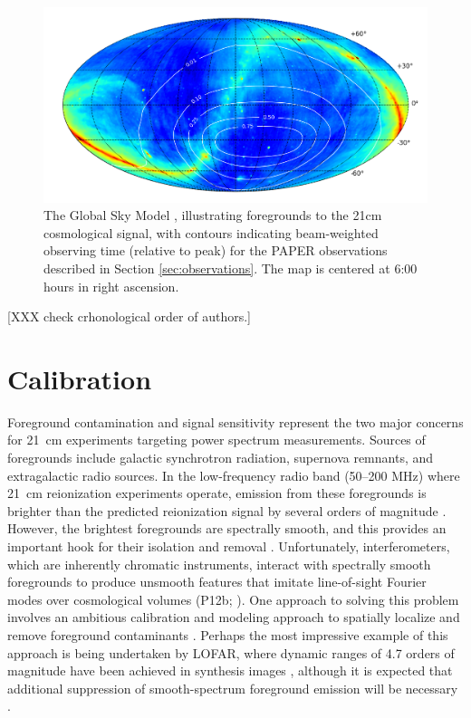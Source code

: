 \documentclass[twocolumn,numberedappendix]{emulateapj} \shorttitle{New Limits on the 21 cm Power Spectrum at $z=8.4$}
\begin{document}
\begin{figure}\centering
\includegraphics[width=2\columnwidth]{plots/coverage.png}
\caption{The Global Sky Model \citep{deoliveira2008}, illustrating foregrounds to the 21cm
cosmological signal, with 
contours indicating beam-weighted observing time (relative to peak) for the PAPER observations
described in Section \ref{sec:observations}.  The map is centered at 6:00 hours in right ascension.
}\label{fig:coverage}
\end{figure}


[XXX check crhonological order of authors.]
\section{Calibration}\label{sec:calib}

Foreground contamination and signal sensitivity represent the two major concerns for 21~cm
experiments targeting power spectrum measurements. Sources of foregrounds include
galactic synchrotron radiation, supernova remnants, and extragalactic radio sources.
In the low-frequency radio band (50--200 MHz) where 21~cm reionization
experiments operate, emission from these foregrounds is brighter than the
predicted reionization signal by several orders of magnitude
\citep{santos_et_al2005,ali_et_al2008,deoliveira2008,jelic_et_al2008,bernardi_et_al2009,bernardi_et_al2010,ghosh_et_al2011}.
However, the brightest foregrounds are spectrally smooth, and this provides an
important hook for their isolation and removal
\citep{liu_et_al2009,petrovic_oh2011,liu_tegmark2012}.  Unfortunately,
interferometers, which are inherently chromatic
instruments, interact with spectrally smooth foregrounds to produce unsmooth features that
imitate line-of-sight Fourier modes over cosmological volumes (P12b; \citealt{bowman_et_al2009,morales_et_al2006a}).
One approach to solving this problem involves an ambitious calibration and modeling approach to spatially localize and
remove foreground contaminants 
\citep{bowman_et_al2008,liu_et_al2008,harker_et_al2009,sullivan_et_al2012,chapman_et_al2013}.
Perhaps the most impressive example of this approach is being undertaken by LOFAR, where dynamic ranges of 4.7 
orders of magnitude have
been achieved in synthesis images \citep{yatawatta_et_al2013}, although it is expected that additional
suppression of smooth-spectrum foreground emission will be necessary \citep{chapman_et_al2013}.
\end{document}
